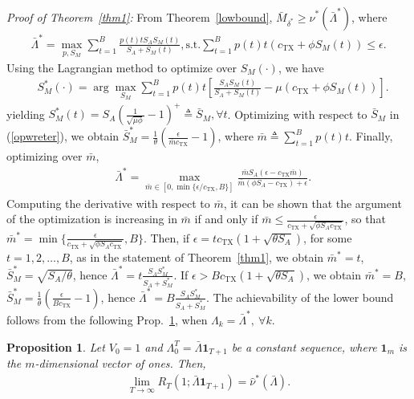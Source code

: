 \documentclass[10pt,twocolumn,twoside]{IEEEtran}
\newtheorem{propos}{Proposition}
\theoremstyle{plain}
\begin{document}
\vspace{-3mm}
\section{}
\label{Proofthm1}
\noindent\emph{Proof of Theorem~\ref{thm1}:}
From Theorem~\ref{lowbound}, $\bar M_{\delta^*}\!\!\geq\!\!\hat\nu^*(\bar \Lambda^*)$,
where
\begin{align}
\label{opwreter}
\!\!\!\bar\Lambda^*\!\!\!=\!\max_{p,S_M}\!\!\sum_{t=1}^B\!\!\frac{p(t)tS_AS_M\!(t)}{S_A+S_M(t)},\!
\text{s.t.}\!\!\sum_{t=1}^B\!\!p(t)t\!\left(c_{\mathrm{TX}}\!+\!\phi S_{M}\!(t)\right)\!\leq\!\epsilon.\!\!\!\end{align}
Using the Lagrangian method to optimize over $S_M(\cdot)$, we have
\begin{align*}
&S_M^*(\cdot)\!=\!\arg\max_{S_M}\!\!\sum_{t=1}^Bp(t)t\!\left[\frac{S_AS_M(t)}{S_A+S_M(t)}-\mu\left(c_{\mathrm{TX}}+\phi S_{M}(t)\right)\right]\!.\!\!
\end{align*}
yielding $S_M^*(t){=}S_A\left(\frac{1}{\sqrt{\mu \phi}}-1\right)^+{\triangleq}\bar S_M,\forall t$.
Optimizing with respect to $\bar S_M$ in (\ref{opwreter}), we obtain $\bar S_{M}^*=\frac{1}{\theta}\left(\frac{\epsilon}{\bar m c_{\mathrm{TX}} }-1\right)$, where $\bar m\triangleq\sum_{t=1}^Bp(t)t$. Finally,
 optimizing over $\bar m$,
\begin{align}
&\bar\Lambda^*\!=\max_{\bar m\in [0,\min\{\epsilon/c_{\mathrm{TX}},B\}]}\frac{\bar mS_A(\epsilon-c_{\mathrm{TX}}\bar m)
}{\bar m\left(\phi S_A-c_{\mathrm{TX}}\right)+\epsilon
}.
\end{align}
Computing the derivative with respect to $\bar m$, it can be shown that the argument of the optimization is increasing in $\bar m$ if and only if
$\bar m\leq\frac{\epsilon}{c_{\mathrm{TX}}+\sqrt{\phi S_Ac_{\mathrm{TX}}}}$,
so that $\bar m^*=\min\{\frac{\epsilon}{c_{\mathrm{TX}}+\sqrt{\phi S_Ac_{\mathrm{TX}}}},B\}$.
Then,
if $\epsilon=tc_{\mathrm{TX}}(1+\sqrt{\theta S_A})$, for some $t=1,2,\dots,B$, as in the statement of Theorem~\ref{thm1},
we obtain $\bar m^*=t$, $\bar S_{M}^*=\sqrt{S_A/\theta}$, hence
 $\bar\Lambda^*=t\frac{S_AS_M^*}{S_A+S_M^*}$.
 If $\epsilon>Bc_{\mathrm{TX}}(1+\sqrt{\theta S_A})$,
 we obtain $\bar m^*=B$, $\bar S_{M}^*=\frac{1}{\theta}\left(\frac{\epsilon}{Bc_{\mathrm{TX}}}-1\right)$, hence
 $\bar\Lambda^*=B\frac{S_AS_M^*}{S_A+S_M^*}$.
The achievability of the lower bound follows from the following Prop.~\ref{lem1}, when $\Lambda_k=\bar\Lambda^*,\ \forall k$.
\begin{propos}
\label{lem1}
Let $V_0{=}1$ and $\Lambda_0^{T}{=}\bar \Lambda\mathbf 1_{T+1}$ be a constant sequence,
where $\mathbf 1_m$ is the $m$-dimensional vector of ones. Then,  
\begin{align}
\lim_{T\to\infty}R_T(1;\bar \Lambda\mathbf 1_{T+1})=\hat\nu^*(\bar \Lambda).
\end{align}
\end{propos}
\end{document}
